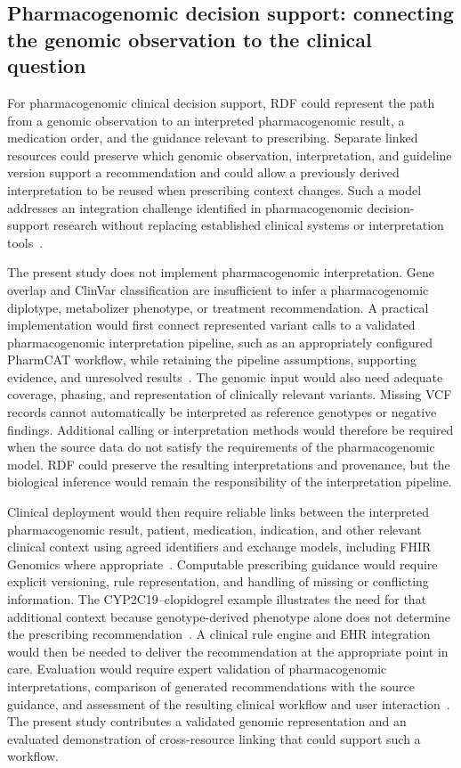 \documentclass[pdflatex,sn-mathphys-num]{sn-jnl}
\begin{document}
\subsection{Pharmacogenomic decision support: connecting the genomic observation to the clinical question}\label{subsec:disc-pgx}
For pharmacogenomic clinical decision support, RDF could represent the path from a genomic observation to an interpreted pharmacogenomic result, a medication order, and the guidance relevant to prescribing.
Separate linked resources could preserve which genomic observation, interpretation, and guideline version support a recommendation and could allow a previously derived interpretation to be reused when prescribing context changes.
Such a model addresses an integration challenge identified in pharmacogenomic decision-support research without replacing established clinical systems or interpretation tools~\cite{wake2022pgx,johnson2024genetically}.

The present study does not implement pharmacogenomic interpretation.
Gene overlap and ClinVar classification are insufficient to infer a pharmacogenomic diplotype, metabolizer phenotype, or treatment recommendation.
A practical implementation would first connect represented variant calls to a validated pharmacogenomic interpretation pipeline, such as an appropriately configured PharmCAT workflow, while retaining the pipeline assumptions, supporting evidence, and unresolved results~\cite{pharmcat}.
The genomic input would also need adequate coverage, phasing, and representation of clinically relevant variants.
Missing VCF records cannot automatically be interpreted as reference genotypes or negative findings.
Additional calling or interpretation methods would therefore be required when the source data do not satisfy the requirements of the pharmacogenomic model.
RDF could preserve the resulting interpretations and provenance, but the biological inference would remain the responsibility of the interpretation pipeline.

Clinical deployment would then require reliable links between the interpreted pharmacogenomic result, patient, medication, indication, and other relevant clinical context using agreed identifiers and exchange models, including FHIR Genomics where appropriate~\cite{fhir_genomics_ig}.
Computable prescribing guidance would require explicit versioning, rule representation, and handling of missing or conflicting information.
The CYP2C19--clopidogrel example illustrates the need for that additional context because genotype-derived phenotype alone does not determine the prescribing recommendation~\cite{lee2022clopidogrel}.
A clinical rule engine and EHR integration would then be needed to deliver the recommendation at the appropriate point in care.
Evaluation would require expert validation of pharmacogenomic interpretations, comparison of generated recommendations with the source guidance, and assessment of the resulting clinical workflow and user interaction~\cite{wake2022pgx}.
The present study contributes a validated genomic representation and an evaluated demonstration of cross-resource linking that could support such a workflow.
\end{document}

